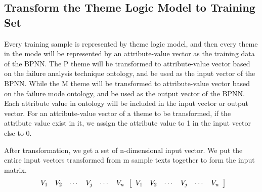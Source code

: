 \documentclass{elsarticle}
\begin{document}
\subsection{Transform the Theme Logic Model to Training Set}
\label{sec:transf-theme-logic}

Every training sample is represented by theme logic model, and then every theme in the mode will be represented by an attribute-value vector as the training data of the BPNN. The P theme will be transformed to attribute-value vector based on the failure analysis technique ontology, and be used as the input vector of the BPNN. While the M theme will be transformed to attribute-value vector based on the failure mode ontology, and be used as the output vector of the BPNN. Each attribute value in ontology will be included in the input vector or output vector. For an attribute-value vector of a theme to be transformed, if the attribute value exist in it, we assign the attribute value to 1 in the input vector else to 0. 

After transformation, we get a set of n-dimensional input vector. We put the entire input vectors transformed from m sample texts together to form the input matrix. 
\[\begin{array}{cccccc}
    V_1&V_2&\cdots&V_j&\cdots&V_n
\end{array}
\newline
\left[  
  \begin{array}{cccccc}
    V_1&V_2&\cdots&V_j&\cdots&V_n
  \end{array} \right]
\]





\end{document}
